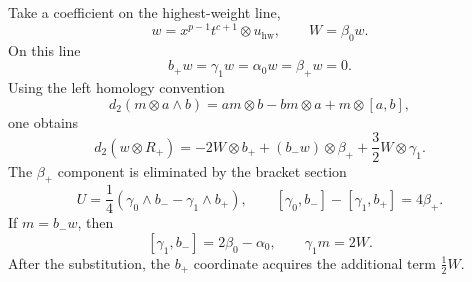 \documentclass[11pt]{article}
\theoremstyle{plain}
\theoremstyle{definition}
\theoremstyle{remark}
\numberwithin{equation}{section}
\begin{document}
Take a coefficient on the highest-weight line,
\[
 w=x^{p-1}t^{c+1}\otimes u_{\mathrm{hw}},
 \qquad W=\beta_0w.
\]
On this line
\[
 b_+w=\gamma_1w=\alpha_0w=\beta_+w=0.
\]
Using the left homology convention
\[
 d_2(m\otimes a\wedge b)=am\otimes b-bm\otimes a+m\otimes[a,b],
\]
one obtains
\begin{equation}\label{eq:Rplus-boundary}
 d_2(w\otimes R_+)
 =-2W\otimes b_+ +(b_-w)\otimes \beta_+ +\frac32W\otimes \gamma_1.
\end{equation}
The $\beta_+$ component is eliminated by the bracket section
\begin{equation}\label{eq:Bplus-section}
 U=\frac14(\gamma_0\wedge b_- - \gamma_1\wedge b_+),
 \qquad
 {[\gamma_0,b_-]}-[\gamma_1,b_+]=4\beta_+.
\end{equation}
If $m=b_-w$, then
\[
 {[\gamma_1,b_-]}=2\beta_0-\alpha_0,
 \qquad \gamma_1m=2W.
\]
After the substitution, the $b_+$ coordinate acquires the additional term
$\frac12W$.
\end{document}
